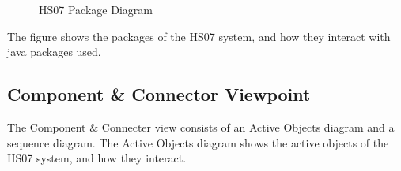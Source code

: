 \documentclass[a4paper,10pt]{article}
\begin{document}
\begin{figure}[!htb]
\caption{HS07 Package Diagram}
\label{fig:mv}
\end{figure}

The figure shows the packages of the HS07 system, and how they interact 
with java packages used.

\subsection{Component \& Connector Viewpoint}

The Component \& Connecter view consists of an Active Objects diagram and a
sequence diagram. The Active Objects diagram shows the active objects of 
the HS07 system, and how they interact. 
\end{document}
